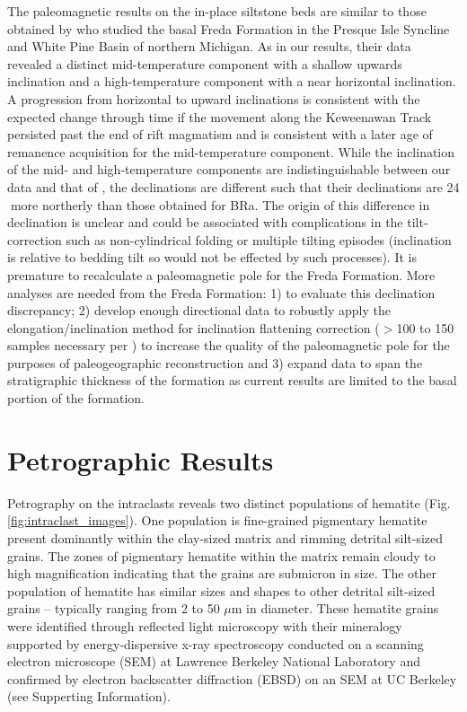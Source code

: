 \documentclass[draft]{agujournal2018}
\begin{document}
The paleomagnetic results on the in-place siltstone beds are similar to those obtained by \citet{Henry1977a} who studied the basal Freda Formation in the Presque Isle Syncline and White Pine Basin of northern Michigan. As in our results, their data revealed a distinct mid-temperature component with a shallow upwards inclination and a high-temperature component with a near horizontal inclination. A progression from horizontal to upward inclinations is consistent with the expected change through time if the movement along the Keweenawan Track persisted past the end of rift magmatism \citep{Fairchild2017a, Swanson-Hysell2018a} and is consistent with a later age of remanence acquisition for the mid-temperature component. While the inclination of the mid- and high-temperature components are indistinguishable between our data and that of \citet{Henry1977a}, the declinations are different such that their declinations are 24\textdegree$\;$more northerly than those obtained for BRa. The origin of this difference in declination is unclear and could be associated with complications in the tilt-correction such as non-cylindrical folding or multiple tilting episodes (inclination is relative to bedding tilt so would not be effected by such processes). It is premature to recalculate a paleomagnetic pole for the Freda Formation. More analyses are needed from the Freda Formation: 1) to evaluate this declination discrepancy; 2) develop enough directional data to robustly apply the elongation/inclination method for inclination flattening correction ($>$100 to 150 samples necessary per \citealp{Tauxe2008a}) to increase the quality of the paleomagnetic pole for the purposes of paleogeographic reconstruction and 3) expand data to span the stratigraphic thickness of the formation as current results are limited to the basal portion of the formation.

\section*{Petrographic Results}

Petrography on the intraclasts reveals two distinct populations of hematite (Fig. \ref{fig:intraclast_images}). One population is fine-grained pigmentary hematite present dominantly within the clay-sized matrix and rimming detrital silt-sized grains. The zones of pigmentary hematite within the matrix remain cloudy to high magnification indicating that the grains are submicron in size. The other population of hematite has similar sizes and shapes to other detrital silt-sized grains -- typically ranging from 2 to 50 $\mu$m in diameter. These hematite grains were identified through reflected light microscopy with their mineralogy supported by energy-dispersive x-ray spectroscopy conducted on a scanning electron microscope (SEM) at Lawrence Berkeley National Laboratory and confirmed by electron backscatter diffraction (EBSD) on an SEM at UC Berkeley (see Supperting Information). 
\end{document}
